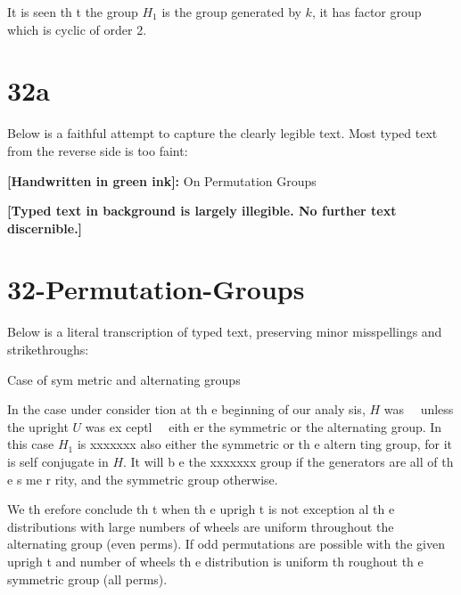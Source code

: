 \documentclass[12pt]{article}
\begin{document}
It is seen th t the group \(H_1\) is the group generated by \(k\),
it has factor group which is cyclic of order 2.

\section{32a}

Below is a faithful attempt to capture the clearly legible text. 
Most typed text from the reverse side is too faint:

\bigskip

\noindent
\textbf{[Handwritten in green ink]:} On Permutation Groups

\bigskip

\noindent
\textbf{[Typed text in background is largely illegible. No further text discernible.]}

\section{32-Permutation-Groups}

Below is a literal transcription of typed text, preserving minor misspellings and strikethroughs:

\bigskip

\noindent
Case of sym metric and alternating groups

In the case under consider tion at th e beginning of our
analy sis, \(H\) was ~~unless the upright \(U\) was ex ceptl~~ eith er the symmetric or the
alternating group. In this case \(H_1\) is xxxxxxx also either
the symmetric or th e altern ting group, for it is self
conjugate in \(H\). It will b e the xxxxxxx group if the
generators are all of th e s me r rity, and the symmetric group
otherwise.

We th erefore conclude th t when th e uprigh t is not
exception al th e distributions with large numbers of
wheels are uniform throughout the alternating group (even perms).
If odd permutations are possible with the given uprigh t and
number of wheels th e distribution is uniform th roughout
th e symmetric group (all perms).

\bigskip
\end{document}
